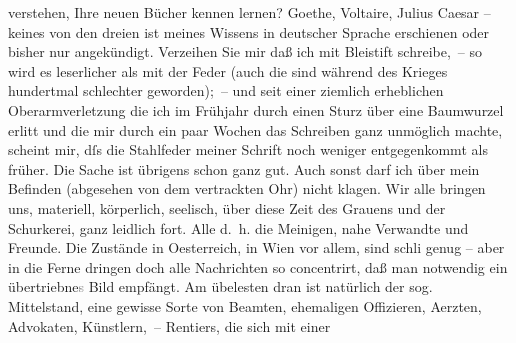 \begin{ledgroupsized}[t]{13cm}
               verstehen, Ihre neuen Bücher kennen lernen? Goethe, Voltaire, Julius Caesar – keines von den dreien ist meines Wissens in deutscher Sprache erschienen oder
               bisher nur angekündigt.\pend
           \pstart
           Verzeihen Sie mir daß ich mit Bleistift schreibe, – so wird es leserlicher als mit
               der Feder (auch die sind während des Krieges hundertmal schlechter geworden); – und
               seit einer ziemlich erheblichen Oberarmverletzung die ich im Frühjahr durch einen
               Sturz über eine Baumwurzel erlitt und die mir durch ein paar Wochen das Schreiben
               ganz unmöglich machte, scheint mir, dſs die Stahlfeder meiner Schrift noch weniger
               entgegenkommt als früher. Die Sache ist übrigens schon ganz gut. Auch sonst darf ich
               über mein Befinden (abgesehen von dem vertrackten Ohr) nicht klagen. Wir alle bringen
               uns, materiell, körperlich, seelisch, über diese Zeit des Grauens und der Schurkerei,
               ganz leidlich fort. Alle {\dotstwo} d. h. die {\pb}Meinigen, nahe Verwandte und Freunde. Die Zustände
               in Oesterreich, in Wien vor allem, sind schli{\geminationm} genug –
               aber in die Ferne dringen doch alle Nachrichten so concentrirt, daß man notwendig ein
                  übertriebne\textcolor{gray}{s} Bild empfängt. Am übelesten \introOben{}dran\introOben{} ist natürlich der sog. Mittelstand, eine gewisse Sorte von Beamten,
               ehemaligen Offizieren, Aerzten, Advokaten, Künstlern, – Rentiers, die sich mit einer

\end{ledgroupsized}
